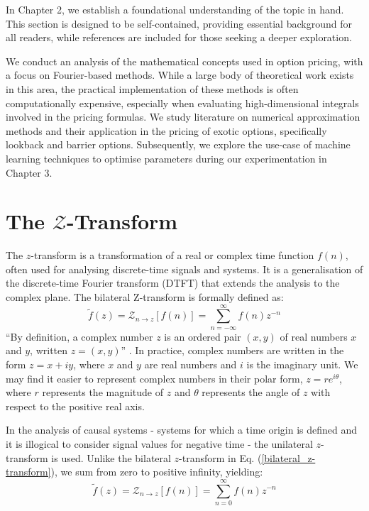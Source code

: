 \documentclass[a4paper]{report}
\begin{document}
In Chapter 2, we establish a foundational understanding of the topic in hand. This section is designed to be self-contained, providing essential background for all readers, while references are included for those seeking a deeper exploration.

We conduct an analysis of the mathematical concepts used in option pricing, with a focus on Fourier-based methods. While a large body of theoretical work exists in this area, the practical implementation of these methods is often computationally expensive, especially when evaluating high-dimensional integrals involved in the pricing formulas. We study literature on numerical approximation methods and their application in the pricing of exotic options, specifically lookback and barrier options. Subsequently, we explore the use-case of machine learning techniques to optimise parameters during our experimentation in Chapter 3.

\section{The \texorpdfstring{$\mathcal{Z}$}{Lg}-Transform}\label{z_transform}

The $z$-transform is a transformation of a real or complex time function $f(n)$, often used for analysing discrete-time signals and systems. It is a generalisation of the discrete-time Fourier transform (DTFT) that extends the analysis to the complex plane. The bilateral Z-transform is formally defined as:
\begin{equation}\label{bilateral_z-transform}
\tilde{f}(z) = \mathcal{Z}_{n \rightarrow z}[f(n)] = \sum^{\infty}_{n = -\infty} f(n)z^{-n}
\end{equation}
``By definition, a complex number $z$ is an ordered pair $(x, y)$ of real numbers $x$ and $y$, written $z = (x, y)$'' \citep{kreyszig2010advanced}. In practice, complex numbers are written in the form $z = x + iy$, where $x$ and $y$ are real numbers and $i$ is the imaginary unit. We may find it easier to represent complex numbers in their polar form, $z = re^{i\theta}$, where $r$ represents the magnitude of $z$ and $\theta$ represents the angle of $z$ with respect to the positive real axis.

In the analysis of causal systems - systems for which a time origin is defined and it is illogical to consider signal values for negative time - the unilateral $z$-transform is used. Unlike the bilateral $z$-transform in Eq. (\ref{bilateral_z-transform}), we sum from zero to positive infinity, yielding:
\begin{equation}\label{unilateral_z-transform}
\tilde{f}(z) = \mathcal{Z}_{n \rightarrow z}[f(n)] = \sum^{\infty}_{n = 0} f(n)z^{-n}
\end{equation}
\end{document}
